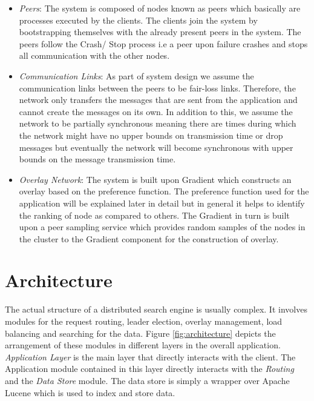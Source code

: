 \documentclass[a4paper,11pt]{kth-mag}
\begin{document}
\begin{itemize}

\item \textit{Peers}: The system is composed of nodes known as peers which basically are processes executed by the clients. The clients join the system by bootstrapping themselves with the already present peers in the system. The peers follow the Crash/ Stop process\cite{guerraoui} i.e a peer upon failure crashes and stops all communication with the other nodes.


\item \textit{Communication Links}: As part of system design we assume the communication links between the peers to be fair-loss links\cite{guerraoui}. Therefore, the network only transfers the messages that are sent from the application and cannot create the messages on its own. In addition to this, we assume the network to be partially synchronous meaning there are times during which the network might have no upper bounds on transmission time or drop messages but eventually the network will become synchronous with upper bounds on the message transmission time.

\item \textit{Overlay Network}: The system is built upon Gradient\cite{sacha2006discovery} which constructs an overlay based on the preference function. The preference function used for the application will be explained later in detail but in general it helps to identify the ranking of node as compared to others. The Gradient in turn is built upon a peer sampling service which provides random samples of the nodes in the cluster to the Gradient component for the construction of overlay.

\end{itemize}





\section{Architecture}
\label{sec:architecture}

The actual structure of a distributed search engine is usually complex. It involves modules for the request routing, leader election, overlay management, load balancing and searching for the data. Figure \ref{fig:architecture} depicts the arrangement of these modules in different layers in the overall application. \textit{Application Layer} is the main layer that directly interacts with the client. The Application module contained in this layer directly interacts with the \textit{Routing} and the \textit{Data Store} module. The data store is simply a wrapper over Apache Lucene which is used to index and store data.
\end{document}

